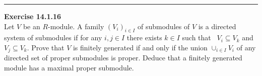 \documentclass[a4paper, 12pt]{article}
\newenvironment{problem}[2][Exercise]
    { \begin{mdframed}[backgroundcolor=gray!20] \textbf{#1 #2} \\}
    {  \end{mdframed}}
\begin{document}
\noindent\rule{7in}{2.8pt}
\begin{problem}{14.1.16}
Let \(V\) be an \(R\)-module. A family \((V_i)_{i\in I}\) of submodules of \(V\) is a directed system of submodules if for any \(i,j\in I\) there exists \(k\in I\) such that \
\(V_i\subseteq V_k\) and \(V_j\subseteq V_k\). Prove that \(V\) is finitely generated if and only if the union \(\cup_{i\in I}V_i\) of any directed set of proper submodules is proper. Deduce that 
a finitely generated module has a maximal proper submodule.
\end{problem}
\end{document}

